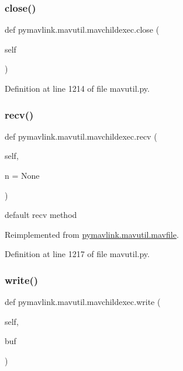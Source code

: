 \subsubsection{\texorpdfstring{close()}{close()}}
{\footnotesize\ttfamily def pymavlink.\+mavutil.\+mavchildexec.\+close (\begin{DoxyParamCaption}\item[{}]{self }\end{DoxyParamCaption})}



Definition at line 1214 of file mavutil.\+py.

\mbox{\label{classpymavlink_1_1mavutil_1_1mavchildexec_a82bdf3a8047fb35d535a82fd85761a52}} 
\subsubsection{\texorpdfstring{recv()}{recv()}}
{\footnotesize\ttfamily def pymavlink.\+mavutil.\+mavchildexec.\+recv (\begin{DoxyParamCaption}\item[{}]{self,  }\item[{}]{n = {\ttfamily None} }\end{DoxyParamCaption})}

\begin{DoxyVerb}default recv method\end{DoxyVerb}
 

Reimplemented from \mbox{\hyperlink{classpymavlink_1_1mavutil_1_1mavfile_a09cb800fc6b03949ace05ce320539be2}{pymavlink.\+mavutil.\+mavfile}}.



Definition at line 1217 of file mavutil.\+py.

\mbox{\label{classpymavlink_1_1mavutil_1_1mavchildexec_af5ffc52892313980ff86884f05b3741a}} 
\subsubsection{\texorpdfstring{write()}{write()}}
{\footnotesize\ttfamily def pymavlink.\+mavutil.\+mavchildexec.\+write (\begin{DoxyParamCaption}\item[{}]{self,  }\item[{}]{buf }\end{DoxyParamCaption})}

